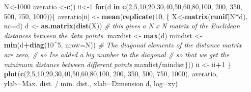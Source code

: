 \documentclass[
]{book}
\newenvironment{Shaded}{\begin{snugshade}}{\end{snugshade}}
\newcommand{\AttributeTok}[1]{\textcolor[rgb]{0.13,0.29,0.53}{#1}}
\newcommand{\CommentTok}[1]{\textcolor[rgb]{0.56,0.35,0.01}{\textit{#1}}}
\newcommand{\ControlFlowTok}[1]{\textcolor[rgb]{0.13,0.29,0.53}{\textbf{#1}}}
\newcommand{\DecValTok}[1]{\textcolor[rgb]{0.00,0.00,0.81}{#1}}
\newcommand{\FunctionTok}[1]{\textcolor[rgb]{0.13,0.29,0.53}{\textbf{#1}}}
\newcommand{\NormalTok}[1]{#1}
\newcommand{\OtherTok}[1]{\textcolor[rgb]{0.56,0.35,0.01}{#1}}
\newcommand{\SpecialCharTok}[1]{\textcolor[rgb]{0.81,0.36,0.00}{\textbf{#1}}}
\newcommand{\StringTok}[1]{\textcolor[rgb]{0.31,0.60,0.02}{#1}}
\theoremstyle{definition}
\theoremstyle{definition}
\theoremstyle{definition}
\theoremstyle{definition}
\theoremstyle{remark}
\begin{document}
\begin{Shaded}
\begin{Highlighting}[]
\NormalTok{N}\OtherTok{\textless{}{-}}\DecValTok{1000}
\NormalTok{averatio }\OtherTok{\textless{}{-}}\FunctionTok{c}\NormalTok{()}
\NormalTok{ii}\OtherTok{\textless{}{-}}\DecValTok{1}
\ControlFlowTok{for}\NormalTok{(d }\ControlFlowTok{in} \FunctionTok{c}\NormalTok{(}\DecValTok{2}\NormalTok{,}\DecValTok{5}\NormalTok{,}\DecValTok{10}\NormalTok{,}\DecValTok{20}\NormalTok{,}\DecValTok{30}\NormalTok{,}\DecValTok{40}\NormalTok{,}\DecValTok{50}\NormalTok{,}\DecValTok{60}\NormalTok{,}\DecValTok{80}\NormalTok{,}\DecValTok{100}\NormalTok{, }\DecValTok{200}\NormalTok{, }\DecValTok{350}\NormalTok{, }\DecValTok{500}\NormalTok{, }\DecValTok{750}\NormalTok{, }\DecValTok{1000}\NormalTok{))\{}
\NormalTok{  averatio[ii] }\OtherTok{\textless{}{-}} \FunctionTok{mean}\NormalTok{(}\FunctionTok{replicate}\NormalTok{(}\DecValTok{10}\NormalTok{, \{}
\NormalTok{  X}\OtherTok{\textless{}{-}}\FunctionTok{matrix}\NormalTok{(}\FunctionTok{runif}\NormalTok{(N}\SpecialCharTok{*}\NormalTok{d), }\AttributeTok{nc=}\NormalTok{d)}
\NormalTok{  d }\OtherTok{\textless{}{-}} \FunctionTok{as.matrix}\NormalTok{(}\FunctionTok{dist}\NormalTok{(X)) }
  \CommentTok{\# this gives a N x N matrix of the Euclidean distances between the data points.}
\NormalTok{  maxdist }\OtherTok{\textless{}{-}} \FunctionTok{max}\NormalTok{(d) }
\NormalTok{  mindist }\OtherTok{\textless{}{-}} \FunctionTok{min}\NormalTok{(d}\SpecialCharTok{+}\FunctionTok{diag}\NormalTok{(}\DecValTok{10}\SpecialCharTok{\^{}}\DecValTok{5}\NormalTok{, }\AttributeTok{nrow=}\NormalTok{N)) }
  \CommentTok{\# The diagonal elements of the distance matrix are zero,}
  \CommentTok{\# so I\textquotesingle{}ve added a big number to the diagonal }
  \CommentTok{\# so that we get the minimum distance between different points}
\NormalTok{  maxdist}\SpecialCharTok{/}\NormalTok{mindist\}))}
\NormalTok{  ii }\OtherTok{\textless{}{-}}\NormalTok{ ii}\SpecialCharTok{+}\DecValTok{1}
\NormalTok{\}}
\FunctionTok{plot}\NormalTok{(}\FunctionTok{c}\NormalTok{(}\DecValTok{2}\NormalTok{,}\DecValTok{5}\NormalTok{,}\DecValTok{10}\NormalTok{,}\DecValTok{20}\NormalTok{,}\DecValTok{30}\NormalTok{,}\DecValTok{40}\NormalTok{,}\DecValTok{50}\NormalTok{,}\DecValTok{60}\NormalTok{,}\DecValTok{80}\NormalTok{,}\DecValTok{100}\NormalTok{, }\DecValTok{200}\NormalTok{, }\DecValTok{350}\NormalTok{, }\DecValTok{500}\NormalTok{, }\DecValTok{750}\NormalTok{, }\DecValTok{1000}\NormalTok{), }
\NormalTok{     averatio, }\AttributeTok{ylab=}\StringTok{\textquotesingle{}Max. dist. / min. dist.\textquotesingle{}}\NormalTok{, }\AttributeTok{xlab=}\StringTok{\textquotesingle{}Dimension d\textquotesingle{}}\NormalTok{, }\AttributeTok{log=}\StringTok{\textquotesingle{}xy\textquotesingle{}}\NormalTok{)}
\end{Highlighting}
\end{Shaded}
\end{document}
